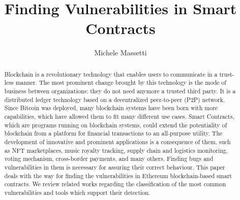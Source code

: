 \documentclass[a4paper,sigconf, language=french,
language=german, language=spanish, language=english]{acmart}
\begin{document}
\title{Finding Vulnerabilities in Smart Contracts}


\author{Michele Massetti}

\renewcommand{\shortauthors}{Massetti.}

\begin{abstract}
Blockchain is a revolutionary technology that enables users to communicate in a trust-less manner. 
The most prominent change brought by this technology is the mode of business between organizations: they do not need anymore a trusted third party. 
It is a distributed ledger technology based on a decentralized peer-to-peer (P2P) network. 
Since Bitcoin was deployed, many blockchain systems have been born with more capabilities, which have allowed them to fit many
different use cases. Smart Contracts, which are programs running on blockchain systems, could extend the potentiality of blockchain
from a platform for financial transactions to an all-purpose utility.
The development of innovative and prominent applications is a consequence of them, such as NFT marketplaces, music royalty tracking, supply chain and logistics monitoring, voting mechanism, 
cross-border payments, and many others.
Finding bugs and vulnerabilities in them is necessary for assuring their correct behaviour. 
This paper deals with the way for finding the vulnerabilities in Ethereum blockchain-based smart contracts. We review related works regarding 
the classification of the most common vulnerabilities and tools which support their detection.
\end{abstract}
\end{document}
